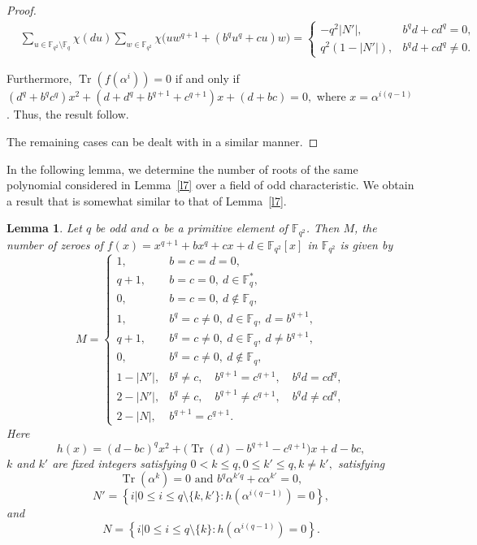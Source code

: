 \documentclass[12pt]{amsart}
\newtheorem{lemma}[theorem]{Lemma}
\theoremstyle{definition}
\theoremstyle{remark}
\numberwithin{equation}{section}
\begin{document}
\begin{proof}
$\begin{aligned}
&\sum_{u\in\mathbb{F}_{q^2}\setminus\mathbb{F}_q}
\chi(du)
\sum_{w\in\mathbb{F}_{q^2}}
\chi\bigl(uw^{q+1}+(b^qu^q+cu)w\bigr)
=
\begin{cases}
-q^2|N'|, & b^qd+cd^q=0,\\[2mm]
q^2(1-|N'|), & b^qd+cd^q\neq0.
\end{cases}
\end{aligned}$

Furthermore, $ \operatorname{Tr}(f(\alpha^i))=0 $ if and only if $ (d^q+b^qc^q)x^2+(d+d^q+b^{q+1}+c^{q+1})x+(d+bc)=0, $ where $ x=\alpha^{i(q-1)}$. Thus, the result follow.

The remaining cases can be dealt with in a similar manner.

\end{proof}
In the following lemma, we determine the number of roots of the same polynomial considered in Lemma~\ref{l7} over a field of odd characteristic. We obtain a result that is somewhat similar to that of Lemma~\ref{l7}.


\begin{lemma}\label{l333}
Let $q$ be odd and $\alpha$ be a primitive element of
$\mathbb{F}_{q^2}$. Then $M$, the number of zeroes of $f(x)=x^{q+1}+bx^q+cx+d\in\mathbb{F}_{q^2}[x]$ in $\mathbb{F}_{q^2}$ is given by
\[
M=
\begin{cases}
1, & b=c=d=0,\\[2mm]
q+1, & b=c=0,\ d\in\mathbb{F}_q^*,\\[2mm]
0, & b=c=0,\ d\notin\mathbb{F}_q,\\[2mm]
1, & b^q=c\neq0,\ d\in\mathbb{F}_q,\ d=b^{q+1},\\[2mm]
q+1, & b^q=c\neq0,\ d\in\mathbb{F}_q,\ d\neq b^{q+1},\\[2mm]
0, & b^q=c\neq0,\ d\notin\mathbb{F}_q,\\[2mm]
1-|N'|, &
b^q\neq c,\quad
b^{q+1}=c^{q+1},\quad
b^q d=cd^q,\\[2mm]
2-|N'|, &
b^q\neq c,\quad
b^{q+1}\neq c^{q+1},\quad
b^q d\neq cd^q,\\[2mm]
2-|N|, &
b^{q+1}=c^{q+1}.
\end{cases}
\]
Here
\[
h(x)
=(d-bc)^q x^2
+\bigl(\operatorname{Tr}(d)-b^{q+1}-c^{q+1}\bigr)x
+d-bc,
\]
$k$ and $k'$ are fixed integers satisfying $0<k\leq q, 0\leq k'\leq q,k\neq k',
$
satisfying
\[\operatorname{Tr}(\alpha^k)=0
\text{ and }
b^q\alpha^{k'q}+c\alpha^{k'}=0,
\]
\[
N'
=
\left\{i|0\leq i\leq q\setminus\{k,k'\}:
h\left(\alpha^{i(q-1)}\right)=0
\right\},
\]
and
\[
N
=
\left\{i|0\leq i \leq q\setminus\{k\}:
h\left(\alpha^{i(q-1)}\right)=0
\right\}.
\]
\end{lemma}
\end{document}
